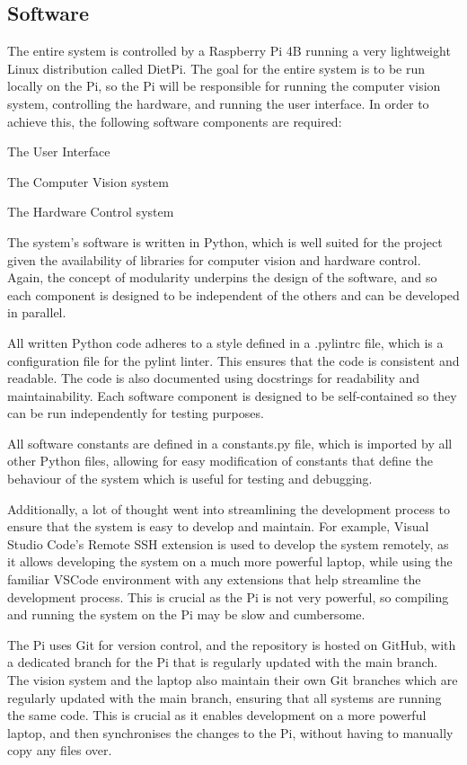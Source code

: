 \subsection{Software}
The entire system is controlled by a Raspberry Pi 4B running a very lightweight Linux distribution called DietPi\cite{dietpi}.
The goal for the entire system is to be run locally on the Pi, so the Pi will be responsible for running the computer vision system,
controlling the hardware, and running the user interface. In order to achieve this, the following software components are required:
\begin{mylist}
  \item The User Interface
  \item The Computer Vision system
  \item The Hardware Control system
\end{mylist}
\noindent
The system's software is written in Python\cite{python}, which is well suited for the project given the 
availability of libraries for computer vision and hardware control. Again, the concept of modularity underpins the design of the software,
and so each component is designed to be independent of the others and can be developed in parallel.

All written Python code adheres to a style defined in a .pylintrc file, which is a configuration file for the pylint\cite{pylint} linter. This ensures
that the code is consistent and readable. The code is also documented using docstrings for 
readability and maintainability. Each software component is designed to be self-contained so they can be run independently for testing purposes.

All software constants are defined in a constants.py file, which is imported by all other Python files, allowing for easy modification of constants
that define the behaviour of the system which is useful for testing and debugging.

Additionally, a lot of thought went into streamlining the development process to ensure that the system is easy to develop and maintain. For example,
Visual Studio Code's\cite{vscode} Remote SSH extension is used to develop the system remotely, as it allows developing the system on a much more powerful laptop, while
using the familiar VSCode environment with any extensions that help streamline the development process. This is crucial as the Pi is not very powerful, so
compiling and running the system on the Pi may be slow and cumbersome.

The Pi uses Git\cite{git} for version control, and the repository is hosted on GitHub\cite{github}, with a dedicated branch for the Pi that is regularly
updated with the main branch. The vision system and the laptop also maintain their own Git branches which are regularly updated with the main branch, ensuring 
that all systems are running the same code. This is crucial as it enables development on a more powerful laptop, and then synchronises the changes to the Pi, without
having to manually copy any files over.

